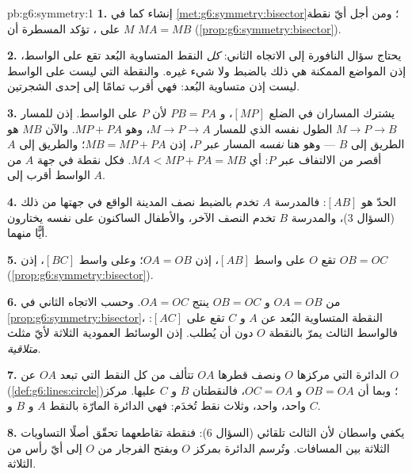 \begin{solution}{pb:g6:symmetry:1}
\textbf{1.} إنشاء كما في \cref{met:g6:symmetry:bisector}؛
ومن أجل أيّ نقطة $M$ على ، تؤكد المسطرة أن $MA = MB$
(\cref{prop:g6:symmetry:bisector}).

\textbf{2.} يحتاج سؤال النافورة إلى الاتجاه الثاني:
\emph{كل} النقط المتساوية البُعد تقع على الواسط، إذن
المواضع الممكنة هي ذلك  بالضبط ولا شيء غيره. والنقطة
التي ليست على الواسط ليست إذن متساوية البُعد:
فهي أقرب تمامًا إلى إحدى الشجرتين.

\textbf{3.} يشترك المساران في الضلع $[MP]$، و $PB = PA$
لأن $P$ على الواسط. إذن للمسار $M \to P \to B$
الطول نفسه الذي للمسار $M \to P \to A$، وهو $MP + PA$.
والآن $MB$ هو الطريق  إلى $B$ --- وهو هنا \emph{نفسه}
المسار عبر $P$، إذن $MB = MP + PA$؛ والطريق  إلى
$A$ أقصر من الالتفاف عبر $P$: أي $MA < MP + PA = MB$.
فكل نقطة في جهة $A$ من الواسط أقرب إلى $A$.

\textbf{4.} الحدّ هو   $[AB]$:
فالمدرسة $A$ تخدم بالضبط نصف المدينة الواقع في جهتها من
ذلك  (السؤال 3)، والمدرسة $B$ تخدم النصف الآخر، والأطفال
الساكنون على  نفسه يختارون أيًّا منهما.

\textbf{5.} تقع $O$ على واسط $[AB]$، إذن $OA = OB$؛
وعلى واسط $[BC]$، إذن $OB = OC$
(\cref{prop:g6:symmetry:bisector}).

\textbf{6.} من $OA = OB$ و $OB = OC$ ينتج $OA = OC$. وحسب
الاتجاه الثاني في \cref{prop:g6:symmetry:bisector}، النقطة
المتساوية البُعد عن $A$ و $C$ تقع على 
 $[AC]$: فالواسط الثالث يمرّ بالنقطة $O$ دون أن
يُطلب. إذن الوسائط العمودية الثلاثة لأيّ مثلث
\emph{متلاقية}.

\textbf{7.} الدائرة التي مركزها $O$ ونصف قطرها $OA$ تتألف من
كل النقط التي تبعد $OA$ عن $O$
(\cref{def:g6:lines:circle})؛ وبما أن $OB = OA$ و $OC = OA$، فالنقطتان
$B$ و $C$ عليها. مركز واحد،  واحد، وثلاث
نقط تُخدَم: فهي الدائرة المارّة بالنقط $A$ و $B$ و $C$.

\textbf{8.} يكفي واسطان لأن الثالث تلقائي
(السؤال 6): فنقطة تقاطعهما تحقّق أصلًا التساويات الثلاثة
بين المسافات. وتُرسم الدائرة بمركز $O$ وبفتح
الفرجار من $O$ إلى أيّ رأس من  الثلاثة.


\end{solution}
